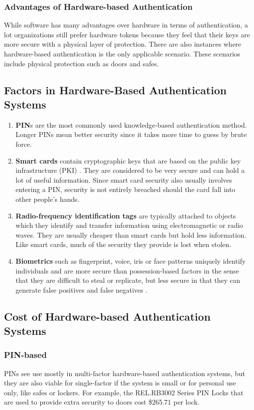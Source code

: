 \subsubsection{Advantages of Hardware-based Authentication}
While software has many advantages over hardware in terms of authentication, a lot organizations still prefer hardware tokens because they feel that their keys are more secure with a physical layer of protection. There are also instances where hardware-based authentication is the only applicable scenario. These scenarios include physical protection such as doors and safes.

\subsection{Factors in Hardware-Based Authentication Systems}
\begin{enumerate}
    \item \textbf{PIN}s are the most commonly used knowledge-based authentication method. Longer PINs mean better security since it takes more time to guess by brute force.
    \item \textbf{Smart cards} contain cryptographic keys that are based on the public key infrastructure (PKI) \cite{AAMHS2011}. They are considered to be very secure and can hold a lot of useful information. Since smart card security also usually involves entering a PIN, security is not entirely breached should the card fall into other people's hands.
    \item \textbf{Radio-frequency identification tags} are typically attached to objects which they identify and transfer information using electromagnetic or radio waves. They are usually cheaper than smart cards but hold less information. Like smart cards, much of the security they provide is lost when stolen.
    \item \textbf{Biometrics} such as fingerprint, voice, iris or face patterns uniquely identify individuals and are more secure than possession-based factors in the sense that they are difficult to steal or replicate, but less secure in that they can generate false positives and false negatives \cite{AAMHS2011}.
\end{enumerate}

\subsection{Cost of Hardware-based Authentication Systems}
\subsubsection{PIN-based}
PINs see use mostly in multi-factor hardware-based authentication systems, but they are also viable for single-factor if the system is small or for personal use only, like safes or lockers. For example, the REL.RB3002 Series PIN Locks that are used to provide extra security to doors cost \$265.71 per lock. \cite{KeylexPin} 

